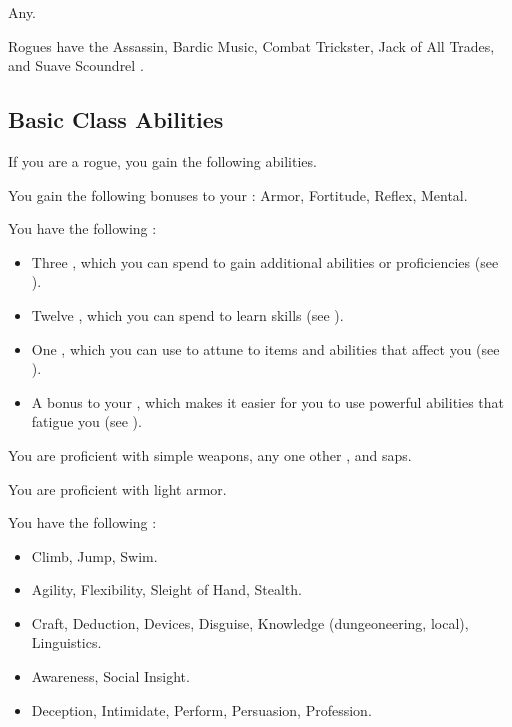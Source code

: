      Any.

     Rogues have the Assassin, Bardic Music, Combat Trickster, Jack of All Trades, and Suave Scoundrel .

    \subsection{Basic Class Abilities}
        If you are a rogue, you gain the following abilities.

        You gain the following bonuses to your :  Armor,  Fortitude,  Reflex,  Mental.

         You have the following :
        \begin{itemize}
            \item Three , which you can spend to gain additional abilities or proficiencies (see ).
            \item Twelve , which you can spend to learn skills (see ).
            \item One , which you can use to attune to items and abilities that affect you (see ).
            \item A  bonus to your , which makes it easier for you to use powerful abilities that fatigue you (see ).
        \end{itemize}

        You are proficient with simple weapons, any one other , and saps.

        You are proficient with light armor.

        You have the following :
        \begin{itemize}
            \item {} Climb, Jump, Swim.
            \item {} Agility, Flexibility, Sleight of Hand, Stealth.
            \item {} Craft, Deduction, Devices, Disguise, Knowledge (dungeoneering, local), Linguistics.
            \item {} Awareness, Social Insight.
            \item {} Deception, Intimidate, Perform, Persuasion, Profession.
        \end{itemize}

